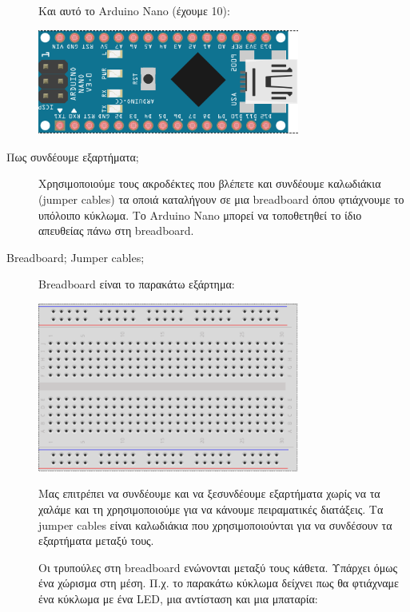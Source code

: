 \documentclass[a4paper,twoside,12pt]{article}
\begin{document}
\begin{description}
Και αυτό το Arduino Nano (έχουμε 10):

\begin{center}
  \includegraphics[width=0.7\textwidth]{images/main/nano}
\end{center}

\item[Πως συνδέουμε εξαρτήματα;]
%
Χρησιμοποιούμε τους ακροδέκτες που βλέπετε και συνδέουμε καλωδιάκια (jumper cables) τα οποιά καταλήγουν σε μια breadboard όπου φτιάχνουμε το υπόλοιπο κύκλωμα. Το Arduino Nano μπορεί να τοποθετηθεί το ίδιο απευθείας πάνω στη breadboard.
%
\item[Breadboard; Jumper cables;]
%
Breadboard είναι το παρακάτω εξάρτημα:

\begin{center}
  \includegraphics[width=0.7\textwidth]{images/main/breadboard}
\end{center}

Μας επιτρέπει να συνδέουμε και να ξεσυνδέουμε εξαρτήματα χωρίς να τα χαλάμε και τη χρησιμοποιούμε για να κάνουμε πειραματικές διατάξεις. Τα jumper cables είναι καλωδιάκια που χρησιμοποιούνται για να συνδέσουν τα εξαρτήματα μεταξύ τους.

Οι τρυπούλες στη breadboard ενώνονται μεταξύ τους κάθετα. Υπάρχει όμως ένα χώρισμα στη μέση.  Π.χ. το παρακάτω κύκλωμα δείχνει πως θα φτιάχναμε ένα κύκλωμα με ένα LED, μια αντίσταση και μια μπαταρία:


\end{description}
\end{document}

